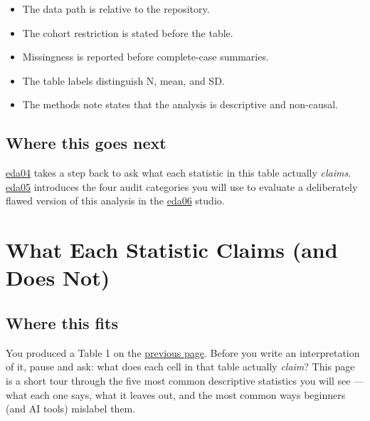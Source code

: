 \documentclass[
  letterpaper,
  DIV=11,
  numbers=noendperiod,
  oneside]{scrreprt}
\providecommand{\tightlist}{%
  \setlength{\itemsep}{0pt}\setlength{\parskip}{0pt}}
\begin{document}

\begin{itemize}
\tightlist
\item
  The data path is relative to the repository.
\item
  The cohort restriction is stated before the table.
\item
  Missingness is reported before complete-case summaries.
\item
  The table labels distinguish N, mean, and SD.
\item
  The methods note states that the analysis is descriptive and
  non-causal.
\end{itemize}

\section*{Where this goes next}\label{where-this-goes-next-9}


\href{eda04-descriptive-statistics-claims.qmd}{eda04} takes a step back
to ask what each statistic in this table actually \emph{claims}.
\href{eda05-ai-audit-categories.qmd}{eda05} introduces the four audit
categories you will use to evaluate a deliberately flawed version of
this analysis in the \href{eda06-studio-planted-errors.qmd}{eda06}
studio.

\chapter*{What Each Statistic Claims (and Does
Not)}\label{what-each-statistic-claims-and-does-not}


\section*{Where this fits}\label{where-this-fits-8}


You produced a Table 1 on the
\hyperref[worked-example-eda-and-table-1]{previous page}. Before you
write an interpretation of it, pause and ask: what does each cell in
that table actually \emph{claim}? This page is a short tour through the
five most common descriptive statistics you will see --- what each one
says, what it leaves out, and the most common ways beginners (and AI
tools) mislabel them.
\end{document}
